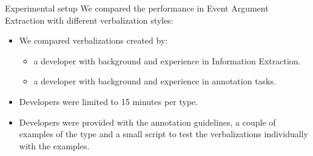 \documentclass[
    11pt,
    notheorems,
    xcolor={dvipsnames},
    hyperref={
        pdfstartview=FitH, 
        pdftitle={Ikasketa-adibide urriko Informazio-Erauzketa}, 
        pdfauthor={Oscar Sainz Jimenez}, 
        citecolor=secondary, 
    }
]{beamer}
\begin{document}




\begin{frame}
    \begin{block}{Experimental setup}
        We compared the performance in Event Argument Extraction with different verbalization styles:
        \begin{itemize}
            \item We compared verbalizations created by:
                  \begin{itemize}
                      \item a developer with  background and experience in Information Extraction.
                      \item a developer with  background and experience in annotation tasks.
                  \end{itemize}
            \item Developers were limited to 15 minutes per type.
            \item Developers were provided with the annotation guidelines, a couple of examples of the type and a small script to test the verbalizations individually with the examples.
        \end{itemize}
    \end{block}
\end{frame}
\end{document}
